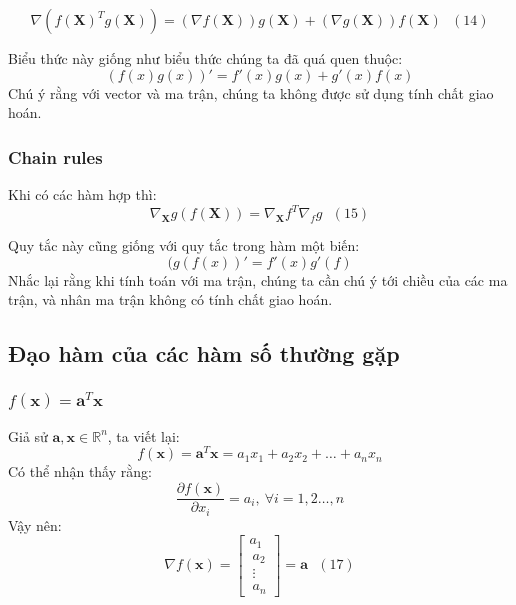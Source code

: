 \begin{equation*} 
\nabla\left( f(\mathbf{X})^Tg(\mathbf{X}) \right) = \left(\nabla f(\mathbf{X})\right) g(\mathbf{X}) + \left(\nabla g(\mathbf{X})\right) f(\mathbf{X}) ~~~ (14) 
\end{equation*} 
 
Biểu thức này giống như biểu thức chúng ta đã quá quen thuộc: 
\begin{equation*} 
\left(f(x)g(x)\right)' = f'(x)g(x) + g'(x)f(x) 
\end{equation*} 
Chú ý rằng với vector và ma trận, chúng ta không được sử dụng tính chất giao hoán.  
 
 
\subsubsection{Chain rules }
Khi có các hàm hợp thì: 
\begin{equation*} 
\nabla_{\mathbf{X}} g(f(\mathbf{X})) = \nabla_{\mathbf{X}} f^T \nabla_{f}g ~~~ (15) 
\end{equation*} 
 
Quy tắc này cũng giống với quy tắc trong hàm một biến:  
\begin{equation*} 
(g(f(x))' = f'(x)g'(f) 
\end{equation*} 
Nhắc lại rằng khi tính toán với ma trận, chúng ta cần chú ý tới chiều của các ma trận, và nhân ma trận không có tính chất giao hoán.  
 
\subsection{Đạo hàm của các hàm số thường gặp }
 
\subsubsection{$f(\mathbf{x}) = \mathbf{a}^T\mathbf{x}$}
 
Giả sử $\mathbf{a}, \mathbf{x} \in \mathbb{R}^n$, ta viết lại: 
\begin{equation*} 
f(\mathbf{x}) = \mathbf{a}^T\mathbf{x} = a_1 x_1 + a_2 x_2 + \dots + a_nx_n 
\end{equation*} 
Có thể nhận thấy rằng: 
\begin{equation*} 
\frac{\partial f(\mathbf{x})}{\partial x_i} = a_i, ~ \forall i = 1, 2\dots, n 
\end{equation*} 
Vậy nên: 
\begin{equation*} 
\nabla f(\mathbf{x}) =  
\left[ 
\begin{matrix} 
    a_1 \\\ 
    a_2 \\\ 
    \vdots \\\ 
    a_n 
\end{matrix} 
\right] = \mathbf{a} ~~~ (17) 
\end{equation*} 
 
